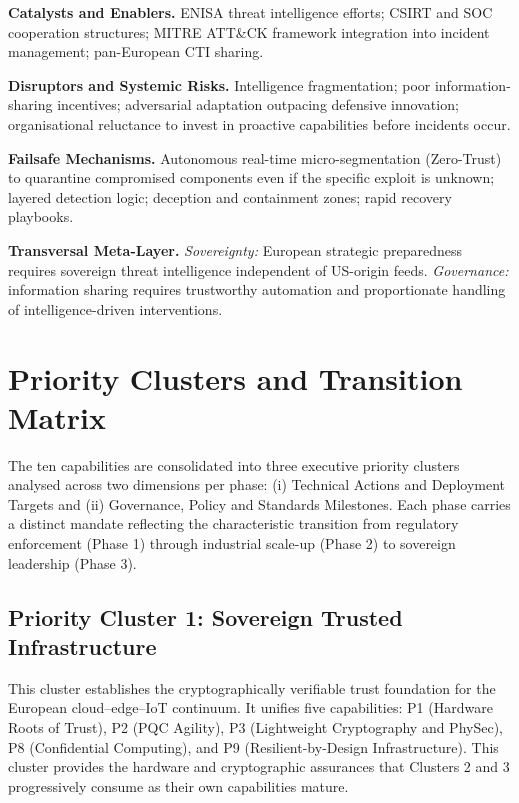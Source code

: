 \documentclass{ieeeaccess}
\begin{document}
\textbf{Catalysts and Enablers.} ENISA threat intelligence efforts;
CSIRT and SOC cooperation structures; MITRE ATT\&CK framework
integration into incident management; pan-European CTI sharing.

\textbf{Disruptors and Systemic Risks.} Intelligence fragmentation; poor
information-sharing incentives; adversarial adaptation outpacing
defensive innovation; organisational reluctance to invest in proactive
capabilities before incidents occur.

\textbf{Failsafe Mechanisms.} Autonomous real-time micro-segmentation
(Zero-Trust) to quarantine compromised components even if the specific
exploit is unknown; layered detection logic; deception and containment
zones; rapid recovery playbooks.

\textbf{Transversal Meta-Layer.} \emph{Sovereignty:} European strategic
preparedness requires sovereign threat intelligence independent of
US-origin feeds. \emph{Governance:} information sharing requires
trustworthy automation and proportionate handling of intelligence-driven
interventions.

\section{Priority Clusters and Transition
Matrix}\label{priority-clusters-and-transition-matrix}

The ten capabilities are consolidated into three executive priority
clusters analysed across two dimensions per phase: (i) Technical Actions
and Deployment Targets and (ii) Governance, Policy and Standards
Milestones. Each phase carries a distinct mandate reflecting the
characteristic transition from regulatory enforcement (Phase 1) through
industrial scale-up (Phase 2) to sovereign leadership (Phase 3).

\subsection{Priority Cluster 1: Sovereign Trusted
Infrastructure}\label{priority-cluster-1-sovereign-trusted-infrastructure}

This cluster establishes the cryptographically verifiable trust
foundation for the European cloud--edge--IoT continuum. It unifies five
capabilities: P1 (Hardware Roots of Trust), P2 (PQC Agility), P3
(Lightweight Cryptography and PhySec), P8 (Confidential Computing), and
P9 (Resilient-by-Design Infrastructure). This cluster provides the
hardware and cryptographic assurances that Clusters 2 and 3
progressively consume as their own capabilities mature.
\end{document}
